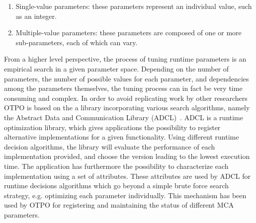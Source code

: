 \begin{enumerate}
\item Single-value parameters: these parameters represent an
  individual value, such as an integer.
\item Multiple-value parameters: these parameters are composed of
  one or more sub-parameters, each of which can vary.
\end{enumerate}

From a higher level perspective, the process of tuning runtime parameters is an empirical search in a given parameter space. Depending on the number of parameters, the number of possible values for each parameter, and dependencies among the parameters themselves, the tuning process can in fact be very time consuming and complex. In order to avoid replicating work by other researchers OTPO is based on the a library incorporating various search algorithms, namely the Abstract Data and Communication Library (ADCL)~\cite{ADCL}. ADCL is a runtime optimization library, which gives applications the possibility to register alternative implementations for a given functionality. Using different runtime decision algorithms, the library will evaluate the performance of each implementation provided, and choose the version leading to the lowest execution time. The application has furthermore the possibility to characterize each implementation using a set of attributes. These attributes are used by ADCL for runtime decisions algorithms which go beyond a simple brute force search strategy, e.g. optimizing each parameter individually. This mechanism has been used by OTPO for registering and maintaining the status of different MCA parameters. 